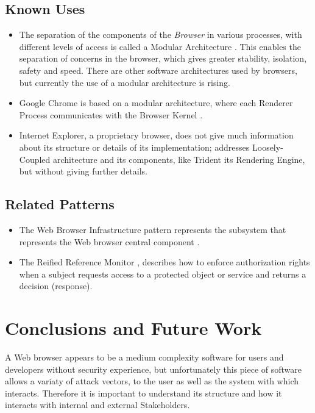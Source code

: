 \documentclass{sig-alternate-05-2015}
\begin{document}
  \subsection*{Known Uses}
  \begin{itemize}
    \item The separation of the components of the \textit{Browser} in various processes, with different levels of access is called a Modular Architecture \cite{Vrbanec2013}. This enables the separation of concerns in the browser, which gives greater stability, isolation, safety and speed. There are other software architectures used by browsers, but currently the use of a modular architecture is rising.
    \item Google Chrome is based on a modular architecture, where each Renderer Process communicates with the Browser Kernel \cite{multiProcGC}. 
    \item Internet Explorer, a proprietary browser, does not give much information about its structure or details of its implementation; \cite{Crowley2010} addresses Loosely-Coupled architecture \cite{IE8-LCIE} and its components, like Trident its Rendering Engine, but without giving further details. 
  \end{itemize}

  \subsection*{Related Patterns}
  \begin{itemize}
    \item The Web Browser Infrastructure pattern represents the subsystem that represents the Web browser central component \cite{silva2015}. 
    \item The Reified Reference Monitor \cite{fernandez2013security}, describes how to enforce authorization rights when a subject requests access to a protected object or service and returns a decision (response). 
  \end{itemize}

\section{Conclusions and Future Work}
A Web browser appears to be a medium complexity software for users and developers without security experience, but unfortunately this piece of software allows a variaty of attack vectors, to the user as well as the system with which interacts. Therefore it is important to understand its structure and how it interacts with internal and external Stakeholders.
\end{document}
